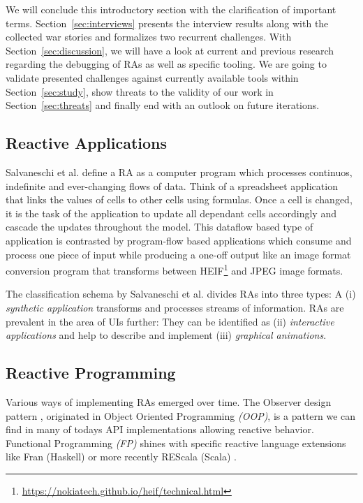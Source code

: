 \documentclass[12pt,a4paper]{article}
\begin{document}
We will conclude this introductory section with the clarification of important terms. Section~\ref{sec:interviews} presents the interview results along with the collected war stories and formalizes two recurrent challenges. With Section~\ref{sec:discussion}, we will have a look at current and previous research regarding the debugging of RAs as well as specific tooling. We are going to validate presented challenges against currently available tools within Section~\ref{sec:study}, show threats to the validity of our work in Section~\ref{sec:threats} and finally end with an outlook on future iterations.

\subsection{Reactive Applications}

Salvaneschi et al. \cite{7827078} define a RA as a computer program which processes continuos, indefinite and ever-changing flows of data. Think of a spreadsheet application\cite{10.1145/2501654.2501666} that links the values of cells to other cells using formulas. Once a cell is changed, it is the task of the application to update all dependant cells accordingly and cascade the updates throughout the model. This dataflow based type of application is contrasted by program-flow based applications which consume and process one piece of input while producing a one-off output like an image format conversion program that transforms between HEIF\footnote{\url{https://nokiatech.github.io/heif/technical.html}} and JPEG image formats.

The classification schema by Salvaneschi et al. \cite{7827078} divides RAs into three types: A (i) \emph{synthetic application} transforms and processes streams of information. RAs are prevalent in the area of UIs further: They can be identified as (ii) \emph{interactive applications} and help to describe and implement (iii) \emph{graphical animations}.

\subsection{Reactive Programming}

Various ways of implementing RAs emerged over time. The Observer design pattern \cite{gamma1995design}, originated in Object Oriented Programming \emph{(OOP)}, is a pattern we can find in many of todays API implementations\cite{alabor:2019:reactiveappllications} allowing reactive behavior. Functional Programming \emph{(FP)} shines with specific reactive language extensions like Fran (Haskell) \cite{10.1145/2501654.2501666} or more recently REScala (Scala) \cite{10.1145/2577080.2577083}.
\end{document}
